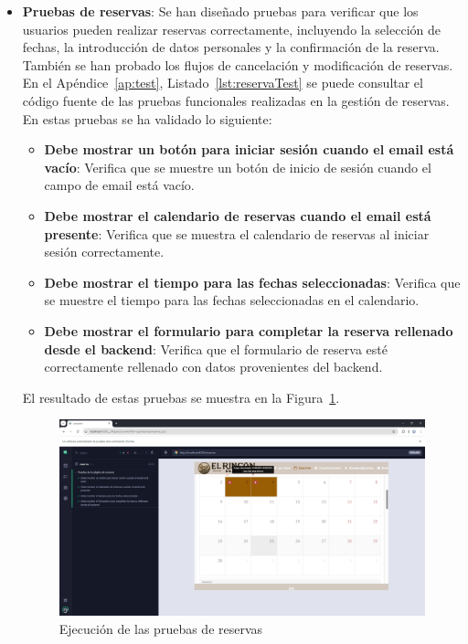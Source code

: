 \begin{itemize}
      \item \textbf{Pruebas de reservas}: Se han diseñado pruebas para verificar que los usuarios pueden realizar reservas correctamente, incluyendo la selección de fechas, la introducción de datos personales y la confirmación de la reserva. También se han probado los flujos de cancelación y modificación de reservas. En el Apéndice~\ref{ap:test}, Listado~\ref{lst:reservaTest} se puede consultar el código fuente de las pruebas funcionales realizadas en la gestión de reservas. En estas pruebas se ha validado lo siguiente:
      \begin{itemize}
        \item \textbf{Debe mostrar un botón para iniciar sesión cuando el email está vacío}: Verifica que se muestre un botón de inicio de sesión cuando el campo de email está vacío.
        \item \textbf{Debe mostrar el calendario de reservas cuando el email está presente}: Verifica que se muestra el calendario de reservas al iniciar sesión correctamente.
        \item \textbf{Debe mostrar el tiempo para las fechas seleccionadas}: Verifica que se muestre el tiempo para las fechas seleccionadas en el calendario.
        \item \textbf{Debe mostrar el formulario para completar la reserva rellenado desde el backend}: Verifica que el formulario de reserva esté correctamente rellenado con datos provenientes del backend.
      \end{itemize}
      El resultado de estas pruebas se muestra en la Figura~\ref{fig:pruebas-reserva}.
\begin{figure}[h!tb]
\centering
\includegraphics[width=1\textwidth]{figs/pruebasReservaTiempo.png}
\caption{Ejecución de las pruebas de reservas}
\label{fig:pruebas-reserva}
\end{figure}


\end{itemize}
